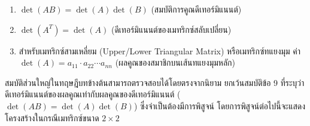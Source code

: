 \begin{thrm}
\begin{enumerate}[leftmargin=1.8em,itemsep=0.3em]
\[    = \det\begin{pmatrix} \vdots \\ \mathbf{u} \\ \vdots \end{pmatrix}
    + \det\begin{pmatrix} \vdots \\ \mathbf{v} \\ \vdots \end{pmatrix}
    \]
    ข้อควรระวังคือสมบัตินี้แยกได้ทีละแถวเท่านั้น ไม่ได้แปลว่า $\det(A+B) = \det(A) + \det(B)$ ซึ่งเป็นข้อความเท็จ ดังตัวอย่างค้านที่จะแสดงต่อไปในหัวข้อนี้
    \item $\det(AB) = \det(A)\det(B)$ \hfill (สมบัติการคูณดีเทอร์มิแนนต์)
    \item $\det(A^T) = \det(A)$ \hfill (ดีเทอร์มิแนนต์ของเมทริกซ์สลับเปลี่ยน)
    \item สำหรับเมทริกซ์สามเหลี่ยม (Upper/Lower Triangular Matrix) หรือเมทริกซ์ทแยงมุม ค่า $\det(A) = a_{11} \cdot a_{22} \cdots a_{nn}$ (ผลคูณของสมาชิกบนเส้นทแยงมุมหลัก)
\end{enumerate}
\end{thrm}

สมบัติส่วนใหญ่ในทฤษฎีบทข้างต้นสามารถตรวจสอบได้โดยตรงจากนิยาม ยกเว้นสมบัติข้อ 9 ที่ระบุว่าดีเทอร์มิแนนต์ของผลคูณเท่ากับผลคูณของดีเทอร์มิแนนต์ ($\det(AB) = \det(A)\det(B)$) ซึ่งจำเป็นต้องมีการพิสูจน์ โดยการพิสูจน์ต่อไปนี้จะแสดงโครงสร้างในกรณีเมทริกซ์ขนาด $2 \times 2$

